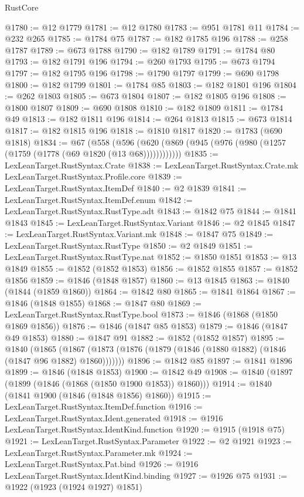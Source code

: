 \begin{lexlean}{RustCore}
\begin{coremodule}
@1780 := @12 @1779
@1781 := @12 @1780
@1783 := @951 @1781 @11
@1784 := @232 @265
@1785 := @1784 @75
@1787 := @182 @1785 @196
@1788 := @258 @1787
@1789 := @673 @1788
@1790 := @182 @1789
@1791 := @1784 @80
@1793 := @182 @1791 @196
@1794 := @260 @1793
@1795 := @673 @1794
@1797 := @182 @1795 @196
@1798 := @1790 @1797
@1799 := @690 @1798
@1800 := @182 @1799
@1801 := @1784 @85
@1803 := @182 @1801 @196
@1804 := @262 @1803
@1805 := @673 @1804
@1807 := @182 @1805 @196
@1808 := @1800 @1807
@1809 := @690 @1808
@1810 := @182 @1809
@1811 := @1784 @49
@1813 := @182 @1811 @196
@1814 := @264 @1813
@1815 := @673 @1814
@1817 := @182 @1815 @196
@1818 := @1810 @1817
@1820 := @1783 (@690 @1818)
@1834 := @67
    (@558 (@596 (@620 (@869 (@945 (@976 (@980 (@1257 (@1759 (@1778 (@69 @1820 (@13 @68))))))))))))
@1835 := LexLeanTarget.RustSyntax.Crate
@1838 := LexLeanTarget.RustSyntax.Crate.mk LexLeanTarget.RustSyntax.Profile.core
@1839 := LexLeanTarget.RustSyntax.ItemDef
@1840 := @2 @1839
@1841 := LexLeanTarget.RustSyntax.ItemDef.enum
@1842 := LexLeanTarget.RustSyntax.RustType.adt
@1843 := @1842 @75
@1844 := @1841 @1843
@1845 := LexLeanTarget.RustSyntax.Variant
@1846 := @2 @1845
@1847 := LexLeanTarget.RustSyntax.Variant.mk
@1848 := @1847 @75
@1849 := LexLeanTarget.RustSyntax.RustType
@1850 := @2 @1849
@1851 := LexLeanTarget.RustSyntax.RustType.nat
@1852 := @1850 @1851
@1853 := @13 @1849
@1855 := @1852 (@1852 @1853)
@1856 := @1852 @1855
@1857 := @1852 @1856
@1859 := @1846 (@1848 @1857)
@1860 := @13 @1845
@1863 := @1840 (@1844 (@1859 @1860))
@1864 := @1842 @80
@1865 := @1841 @1864
@1867 := @1846 (@1848 @1855)
@1868 := @1847 @80
@1869 := LexLeanTarget.RustSyntax.RustType.bool
@1873 := @1846 (@1868 (@1850 @1869 @1856))
@1876 := @1846 (@1847 @85 @1853)
@1879 := @1846 (@1847 @49 @1853)
@1880 := @1847 @91
@1882 := @1852 (@1852 @1857)
@1895 := @1840
    (@1865 (@1867 (@1873 (@1876 (@1879 (@1846 (@1880 @1882) (@1846 (@1847 @96 @1882) @1860)))))))
@1896 := @1842 @85
@1897 := @1841 @1896
@1899 := @1846 (@1848 @1853)
@1900 := @1842 @49
@1908 := @1840 (@1897 (@1899 (@1846 (@1868 (@1850 @1900 @1853)) @1860)))
@1914 := @1840 (@1841 @1900 (@1846 (@1848 @1856) @1860))
@1915 := LexLeanTarget.RustSyntax.ItemDef.function
@1916 := LexLeanTarget.RustSyntax.Ident.generated
@1918 := @1916 LexLeanTarget.RustSyntax.IdentKind.function
@1920 := @1915 (@1918 @75)
@1921 := LexLeanTarget.RustSyntax.Parameter
@1922 := @2 @1921
@1923 := LexLeanTarget.RustSyntax.Parameter.mk
@1924 := LexLeanTarget.RustSyntax.Pat.bind
@1926 := @1916 LexLeanTarget.RustSyntax.IdentKind.binding
@1927 := @1926 @75
@1931 := @1922 (@1923 (@1924 @1927) @1851)

\end{coremodule}
\end{lexlean}
